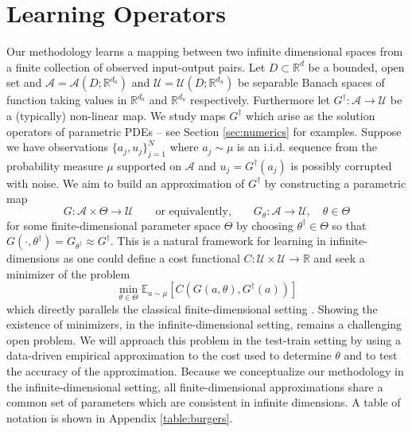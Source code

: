 \documentclass{article} %
\newcommand{\R}{\mathbb{R}}
\newcommand{\E}{\mathbb{E}}
\newcommand{\A}{\mathcal{A}}
\newcommand{\U}{\mathcal{U}}
\newcommand{\Ftrue}{G^\dagger}
\newcommand{\F}{{G}}
\begin{document}
\section{Learning Operators}
\label{sec:operator}
Our methodology learns a mapping between two infinite dimensional spaces from a finite
collection of observed input-output pairs. Let  $D \subset \R^d$ be a bounded, open set and \(\A = \A(D;\R^{d_a})\) and \(\U= \U(D;\R^{d_u})\) be separable Banach spaces of function taking values in \(\R^{d_a}\) and \(\R^{d_u}\) respectively. Furthermore let \(\Ftrue : \A \to \U\) be a (typically) non-linear map. We study maps \(\Ftrue\) which arise as the solution operators of parametric PDEs -- see Section \ref{sec:numerics} for examples. Suppose we have observations \(\{a_j, u_j\}_{j=1}^N\) where 
\(a_j \sim \mu\) is an i.i.d. sequence from the probability measure \(\mu\) supported on 
\(\A\) and \(u_j = \Ftrue(a_j)\) is possibly corrupted with noise. We aim to build an approximation of \(\Ftrue\) by 
constructing a parametric map 
\begin{equation}
\label{eq:approxmap}
\F : \A \times \Theta \to \U
\qquad
\text{or equivalently,}
\qquad
\F_{\theta} : \A \to \U, \quad \theta \in \Theta
\end{equation}
for some finite-dimensional parameter space \(\Theta\) by choosing
\(\theta^\dagger \in \Theta\) so that \(\F(\cdot, \theta^\dagger) = \F_{\theta^\dagger} \approx \Ftrue\).
This is a natural framework for learning in infinite-dimensions as one could define a cost functional \(C : \U \times \U \to \R\) and seek a minimizer of the problem
\[\min_{\theta \in \Theta} \E_{a \sim \mu} [C(\F(a,\theta), \Ftrue(a))]\]
which directly parallels the classical finite-dimensional 
setting \citep{Vapnik1998}. Showing the existence of minimizers, in the infinite-dimensional setting, remains a challenging open problem. We will approach this problem in the test-train setting by using a data-driven
empirical approximation to the cost used to determine
$\theta$ and to test the accuracy of the approximation.
Because we conceptualize our methodology in the infinite-dimensional setting, all finite-dimensional approximations share a common set of parameters which are consistent in infinite dimensions. 
A table of notation is shown in Appendix \ref{table:burgers}.
\end{document}
